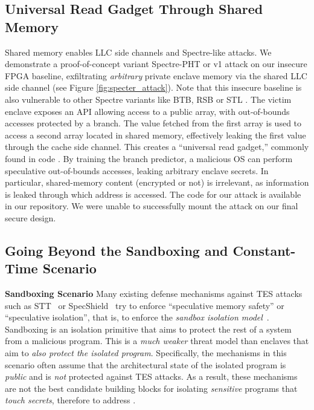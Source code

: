 \subsection{Universal Read Gadget Through Shared Memory}
\label{sec:attackandexisting}
Shared memory enables LLC side channels and Spectre-like attacks. 
We demonstrate a proof-of-concept variant Spectre-PHT or v1 \cite{kocher2018spectre} attack on our insecure FPGA baseline, exfiltrating \emph{arbitrary} private enclave memory via the shared LLC side channel (see Figure \ref{fig:specter_attack}).
Note that this insecure baseline is also vulnerable to other Spectre variants like BTB, RSB or STL \cite{canella2019systematic, wiebing2024inspectre, barberis2022branch, koruyeh2018spectre, maisuradze2018ret2spec, horn2018speculative}.
The victim enclave exposes an API allowing access to a public array, with out-of-bounds accesses protected by a branch.
The value fetched from the first array is used to access a second array located in shared memory, effectively leaking the first value through the cache side channel.
This creates a ``universal read gadget,'' commonly found in code \cite{wiebing2024inspectre, johannesmeyer2022kasper, qi2021spectaint, canella2019systematic}.
By training the branch predictor, a malicious OS can perform speculative out-of-bounds accesses, leaking arbitrary enclave secrets.
In particular, shared-memory content (encrypted or not) is irrelevant, as information is leaked through which address is accessed.
The code for our attack is available in our repository.
We were unable to successfully mount the attack on our final secure design.

\subsection{Going Beyond the Sandboxing and Constant-Time Scenario}
\label{sec:beyondsandboxing}
\noindent\textbf{Sandboxing Scenario}
Many existing defense mechanisms against TES attacks such as STT~\cite{yu2019speculative, jauch2023secure} or SpecShield~\cite{barber2019specshield} try to enforce ``speculative memory safety'' or ``speculative isolation'', that is, to enforce the \emph{sandbox isolation model}~\cite{cheang2019formal, narayan2021swivel, qi2021spectaint, shen2018restricting, jenkins2020ghostbusting, oleksenko2020specfuzz, kirzner2021analysis, yu2020speculative, narayan2023going, behrens2020efficiently}.
Sandboxing is an isolation primitive that aims to protect the rest of a system from a malicious program.
This is a \emph{much weaker} threat model than enclaves that aim to \emph{also protect the isolated program}.
Specifically, the mechanisms in this scenario often assume that the architectural state of the isolated program is \emph{public} and is \emph{not} protected against TES attacks.
As a result, these mechanisms are not the best candidate building blocks for isolating \emph{sensitive} programs that \emph{touch secrets}, therefore to address \prob{}.
\\

